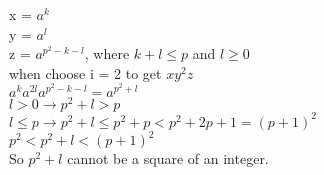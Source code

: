 \documentclass[12pt]{article}
\begin{document}
x = $a^k$\\
y = $a^l$\\
z = $a^{p^2-k-l}$, where $k+l \leq p $ and $l \geq 0$ \\
when choose i = 2 to get $xy^2z$ \\
$a^k a^{2l} a^{p^2-k-l} = a^{p^2+l}$ \\
$l>0 \rightarrow p^2 + l > p$ \\
$ l \leq p \rightarrow p^2 + l \leq p^2 + p < p^2 + 2p + 1 = (p+1)^2$ \\

$p^2 < p^2 + l < (p+1)^2$ \\
So $p^2 + l$ cannot be a square of an integer.\\
\end{document}
